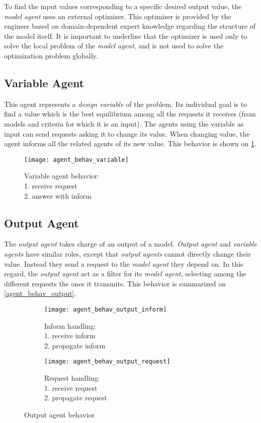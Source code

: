 To find the input values corresponding to a specific desired output value, the \emph{model agent} uses an external optimizer. This optimizer is provided by the engineer based on domain-dependent expert knowledge regarding the structure of the model itself.
It is important to underline that the optimizer is used only to solve the local problem of the \emph{model agent}, and is not used to solve the optimization problem globally.

\subsection{Variable Agent}

This agent represents a \emph{design variable} of the problem. Its individual goal is to find a value which is the best equilibrium among all the requests it receives (from models and criteria for which it is an input). The agents using the variable as input can send requests asking it to change its value. When changing value, the agent informs all the related agents of its new value. This behavior is shown on \figurename{} \ref{agent_behav_variable}. 

\begin{figure}
\centering
\texttt{[image: agent\_behav\_variable]}
\caption{Variable agent behavior:\\1. receive request\\2. answer with inform}\label{agent_behav_variable}
\end{figure}

\subsection{Output Agent}
The \emph{output agent} takes charge of an output of a model. \emph{Output agent} and \emph{variable agents} have similar roles, except that \emph{output agents} cannot directly change their value. Instead they send a request to the \emph{model agent} they depend on. In this regard, the \emph{output agent} act as a filter for its \emph{model agent}, selecting among the different requests the ones it transmits. This behavior is summarized on \figurename{} \ref{agent_behav_output}.

\begin{figure}
\centering
\begin{subfigure}{0.25\textwidth}
		\centering
		\texttt{[image: agent\_behav\_output\_inform]}
		\caption{Inform handling:\\1. receive inform\\2. propagate inform}\label{agent_behav_output:inf}
\end{subfigure}
\qquad
\begin{subfigure}{0.25\textwidth}
		\centering
		\texttt{[image: agent\_behav\_output\_request]}
		\caption{Request handling:\\1. receive request\\2. propagate request}\label{agent_behav_output:req}
\end{subfigure}
\caption{Output agent behavior}\label{agent_behav_output.}
\end{figure}

